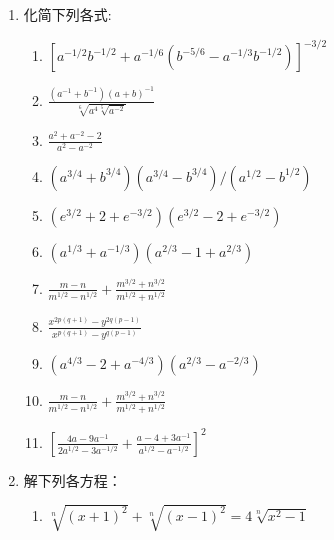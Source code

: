 \begin{enumerate}
\item  化简下列各式:
\begin{enumerate}
\item  $\left[a^{-1 / 2} b^{-1 / 2}+a^{-1 / 6}\left(b^{-5 / 6}-a^{-1 / 3} b^{-1 / 2}\right)\right]^{-3 / 2}$
\item  $\frac{\left(a^{-1}+b^{-1}\right)(a+b)^{-1}}{\sqrt[6]{a^{4} \sqrt[5]{a^{-2}}}}$
\item  $\frac{a^{2}+a^{-2}-2}{a^{2}-a^{-2}}$
\item  $\left(a^{3 / 4}+b^{3 / 4}\right)\left(a^{3 / 4}-b^{3 / 4}\right) /\left(a^{1 / 2}-b^{1 / 2}\right)$
\item  $\left(e^{3 / 2}+2+e^{-3 / 2}\right)\left(e^{3 / 2}-2+e^{-3 / 2}\right)$
\item  $\left(a^{1 / 3}+a^{-1 / 3}\right)\left(a^{2 / 3}-1+a^{2 / 3}\right)$
\item  $\frac{m-n}{m^{1 / 2}-n^{1 / 2}}+\frac{m^{3 / 2}+n^{3/2}}{m^{1 / 2}+n^{1 / 2}}$
\item  $\frac{x^{2 p(q+1)}-y^{2 q(p-1)}}{x^{p(q+1)}-y^{q(p-1)}}$
\item  $\left(a^{4 / 3}-2+a^{-4 / 3}\right)\left(a^{2 / 3}-a^{-2 / 3}\right)$
\item  $\frac{m-n}{m^{1 / 2}-n^{1 / 2}}+\frac{m^{3 / 2}+n^{3/2}}{m^{1 / 2}+n^{1 / 2}}$
\item  $\left[\frac{4 a-9 a^{-1}}{2 a^{1 / 2}-3 a^{-1 / 2}}+\frac{a-4+3 a^{-1}}{a^{1 / 2}-a^{-1 / 2}}\right]^{2}$
\end{enumerate}

\item  解下列各方程：
  \begin{enumerate}
  \item  $\sqrt[n]{(x+1)^{2}}+\sqrt[n]{(x-1)^{2}}=4 \sqrt[n]{x^{2}-1}$
\end{enumerate}


\end{enumerate}
